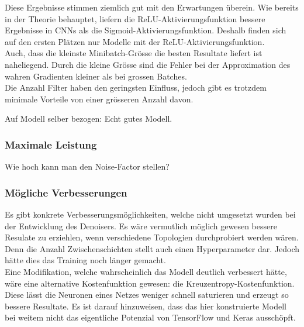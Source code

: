 Diese Ergebnisse stimmen ziemlich gut mit den Erwartungen überein. Wie bereits
in der Theorie behauptet, liefern die ReLU-Aktivierungsfunktion bessere Ergebnisse
in CNNs als die Sigmoid-Aktivierungsfunktion. Deshalb finden sich auf den ersten
Plätzen nur Modelle mit der ReLU-Aktivierungsfunktion. \\
Auch, dass die kleinste Minibatch-Grösse die besten Resultate liefert ist
naheliegend. Durch die kleine Grösse sind die Fehler bei der Approximation des
wahren Gradienten kleiner als bei grossen Batches. \\
Die Anzahl Filter haben den geringsten Einfluss, jedoch gibt es trotzdem
minimale Vorteile von einer grösseren Anzahl davon.


Auf Modell selber bezogen:
Echt gutes Modell.
\subsubsection{Maximale Leistung}
Wie hoch kann man den Noise-Factor stellen?

\subsubsection{Mögliche Verbesserungen}
Es gibt konkrete Verbesserungsmöglichkeiten, welche nicht umgesetzt wurden bei
der Entwicklung des Denoisers. Es wäre vermutlich möglich gewesen bessere
Resulate zu erziehlen, wenn verschiedene Topologien durchprobiert werden wären.
Denn die Anzahl Zwischenschichten stellt auch einen Hyperparameter dar. Jedoch
hätte dies das Training noch länger gemacht. \\
Eine Modifikation, welche wahrscheinlich das Modell deutlich verbessert hätte,
wäre eine alternative Kostenfunktion gewesen: die Kreuzentropy-Kostenfunktion.
Diese lässt die Neuronen eines Netzes weniger schnell saturieren und erzeugt so
bessere Resultate.
\para{}
Es ist darauf hinzuweisen, dass das hier konstruierte Modell bei weitem nicht
das eigentliche Potenzial von TensorFlow und Keras ausschöpft.



